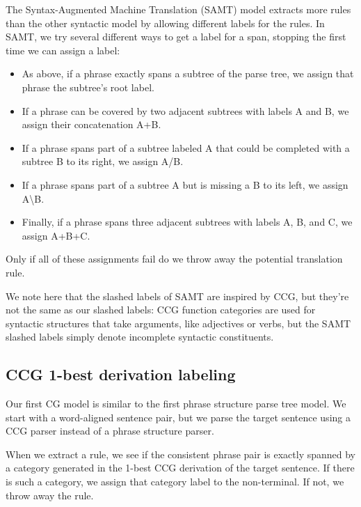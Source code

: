 \documentclass{article}
\begin{document}
The Syntax-Augmented Machine Translation (SAMT) model \cite{samt-wmt06} extracts more rules than the other syntactic model by allowing different labels for the rules. In SAMT, we try several different ways to get a label for a span, stopping the first time we can assign a label:
\begin{itemize}
\item As above, if a phrase exactly spans a subtree of the parse tree, we assign that phrase the subtree's root label.
\item If a phrase can be covered by two adjacent subtrees with labels A and B, we assign their concatenation A+B.
\item If a phrase spans part of a subtree labeled A that could be completed with a subtree B to its right, we assign A/B.
\item If a phrase spans part of a subtree A but is missing a B to its left, we assign A\textbackslash B.
\item Finally, if a phrase spans three adjacent subtrees with labels A, B, and C, we assign A+B+C.
\end{itemize}
Only if all of these assignments fail do we throw away the potential translation rule.

We note here that the slashed labels of SAMT are inspired by CCG, but they're not the same as our slashed labels: CCG function categories are used for syntactic structures that take arguments, like adjectives or verbs, but the SAMT slashed labels simply denote incomplete syntactic constituents.

\subsection{CCG 1-best derivation labeling}

Our first CG model is similar to the first phrase structure parse tree model. We start with a word-aligned sentence pair, but we parse the target sentence using a CCG parser instead of a phrase structure parser.

When we extract a rule, we see if the consistent phrase pair is exactly spanned by a category generated in the 1-best CCG derivation of the target sentence. If there is such a category, we assign that category label to the non-terminal. If not, we throw away the rule.
\end{document}
